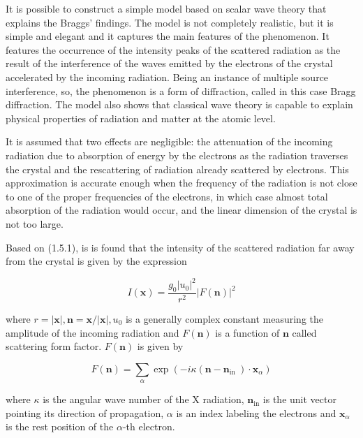 \documentclass{article}
\begin{document}
It is possible to construct a simple model based on scalar wave theory that explains the Braggs' findings. The model is not completely realistic, but it is simple and elegant and it captures the main features of the phenomenon. It features the occurrence of the intensity peaks of the scattered radiation as the result of the interference of the waves emitted by the electrons of the crystal accelerated by the incoming radiation. Being an instance of multiple source interference, so, the phenomenon is a form of diffraction, called in this case Bragg diffraction. The model also shows that classical wave theory is capable to explain physical properties of radiation and matter at the atomic level.

It is assumed that two effects are negligible: the attenuation of the incoming radiation due to absorption of energy by the electrons as the radiation traverses the crystal and the rescattering of radiation already scattered by electrons. This approximation is accurate enough when the frequency of the radiation is not
close to one of the proper frequencies of the electrons, in which case almost total absorption of the radiation would occur, and the linear dimension of the crystal is not too large.

Based on (1.5.1), is is found that the intensity of the scattered radiation far away from the crystal is given by the expression
 
\begin{equation*}
I(\boldsymbol{x})=\frac{g_{0}\left|u_{0}\right|^{2}}{r^{2}}|F(\boldsymbol{n})|^{2} \tag{1.8.1}
\end{equation*}
 
where $r=|\boldsymbol{x}|, \boldsymbol{n}=\boldsymbol{x} /|\boldsymbol{x}|, u_{0}$ is a generally complex constant measuring the amplitude of the incoming radiation and $F(\boldsymbol{n})$ is a function of $\boldsymbol{n}$ called scattering form factor. $F(\boldsymbol{n})$ is given by
 
\begin{equation*}
F(\boldsymbol{n})=\sum_{\alpha} \exp \left(-i \kappa\left(\boldsymbol{n}-\boldsymbol{n}_{\text {in }}\right) \cdot \boldsymbol{x}_{\alpha}\right) \tag{1.8.2}
\end{equation*}
 
where $\kappa$ is the angular wave number of the X radiation, $\boldsymbol{n}_{\mathrm{in}}$ is the unit vector pointing its direction of propagation, $\alpha$ is an index labeling the electrons and $\boldsymbol{x}_{\alpha}$ is the rest position of the $\alpha$-th electron.
\end{document}
